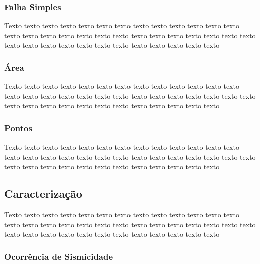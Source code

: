 \subsubsection{Falha Simples}
\label{sec:fonte_falha_complexa}



Texto texto texto texto texto texto texto texto texto texto texto texto texto
texto texto texto texto texto texto texto texto texto texto texto texto texto
texto texto texto texto texto texto texto texto texto texto texto texto texto



\subsubsection{Área}
\label{sec:fonte_falha_complexa}


Texto texto texto texto texto texto texto texto texto texto texto texto texto
texto texto texto texto texto texto texto texto texto texto texto texto texto
texto texto texto texto texto texto texto texto texto texto texto texto texto



\subsubsection{Pontos}
\label{sec:fonte_falha_complexa}


Texto texto texto texto texto texto texto texto texto texto texto texto texto
texto texto texto texto texto texto texto texto texto texto texto texto texto
texto texto texto texto texto texto texto texto texto texto texto texto texto



\subsection{Caracterização}
\label{sec:fontes}



Texto texto texto texto texto texto texto texto texto texto texto texto texto
texto texto texto texto texto texto texto texto texto texto texto texto texto
texto texto texto texto texto texto texto texto texto texto texto texto texto



\subsubsection{Ocorrência de Sismicidade}
\label{sec:fontes}


